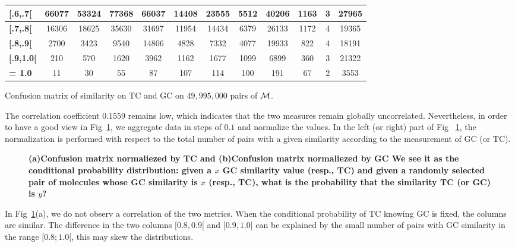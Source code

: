 \documentclass[10pt,letterpaper]{article}
\begin{document}
\begin{table}[!ht]
\begin{adjustwidth}{-1.25in}{0in}
\begin{tabular}{|p{1cm}|c|c|c|c|c|c|c|c|c|c|c|}
\textbf{[.6,.7[} &66077 &53324 &77368 &66037 &14408 &23555 &5512 &40206 &1163 &3 &27965 \\ \hline

\textbf{[.7,.8[} &16306 &18625 &35630 &31697 &11954 &14434 &6379 &26133 &1172 &4 &19365 \\ \hline

\textbf{[.8,.9[} &2700 &3423 &9540 &14806 &4828 &7332 &4077 &19933 &822 &4 &18191 \\ \hline

\textbf{[.9,1.0[} &210 &570 &1620 &3962 &1162 &1677 &1099 &6899 &360 &3 &21322 \\ \hline

\textbf{= 1.0} &11 &30 &55 &87 &107 &114 &100 &191 &67 &2 &3553 \\ \hline



 \end{tabular}

\begin{flushleft} Confusion matrix of similarity on TC and GC on $49,995,000$ pairs of ${\cal M}$.

\end{flushleft}

\label{table4}

\end{adjustwidth}

\end{table}


The correlation coefficient $0.1559$ remains low, which indicates that the two measures remain globally uncorrelated. Nevertheless, in order to have a good view in Fig~\ref{newfig2}, we aggregate data in steps of $0.1$ and normalize the values. In the left (or right) part of Fig ~\ref{newfig2}, the normalization is performed with respect to the total number of pairs with a given similarity according to the measurement of GC (or TC). 

\begin{figure}[!h]
	\caption{\bf{(a)Confusion matrix normaliezed by TC and (b)Confusion matrix normaliezed by GC } 
We see it as the conditional probability distribution: given a $x$ GC similarity value (resp., TC) and given a randomly selected pair of molecules whose GC similarity is $x$ (resp., TC), what is the probability that the similarity TC (or GC) is $y$?}
	\label{newfig2}
\end{figure}


In Fig~\ref{newfig2}(a), we do not observ a correlation of the two metrics. When the conditional probability of TC knowing GC is fixed, the columns are similar. The difference in the two columns $[0.8, 0.9[$ and $[0.9, 1.0[$ can be explained by the small number of pairs with GC similarity in the range $[0.8; 1.0 [$, this may skew the distributions.
\end{document}
